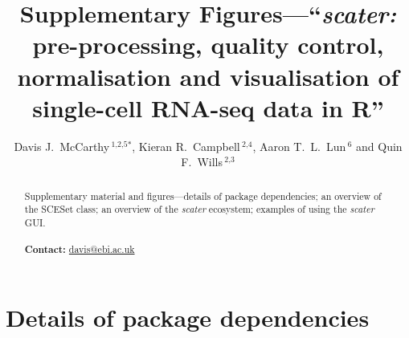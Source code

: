 \documentclass{revtex4}
\begin{document}
\title[scater supplementary figures]{Supplementary Figures---``\emph{scater:} pre-processing, quality control, normalisation and visualisation of single-cell RNA-seq data in R''}
\author{Davis J.~McCarthy\,$^{\text{1,2,5}*}$, Kieran R.~Campbell\,$^{\text{2,4}}$, Aaron T.~L.~Lun\,$^{\text{6}}$ and Quin F.~Wills\,$^{\text{2,3}}$}
\address{$^{\text{1}}$European Molecular Biology Laboratory - European Bioinformatics Institute (EMBL-EBI), Hinxton CB10 1SD, United Kingdom;\\
$^{\text{2}}$Wellcome Trust Centre for Human Genetics, University of Oxford,
Roosevelt Drive, Oxford OX3 7BN, United Kingdom;\\
$^{\text{3}}$Weatherall Institute for Molecular Medicine, University of Oxford, John Radcliffe Hospital, Oxford OX3 9DS, United Kingdom;\\
$^{\text{4}}$Department of Physiology, Anatomy and Genetics, University of Oxford, South Parks Road, Oxford OX1 3QX, United Kingdom;\\
$^{\text{5}}$St Vincent's Institute of Medical Research, 41 Victoria Parade, Fitzroy Victoria 3065, Australia; and \\
$^{\text{6}}$CRUK Cambridge Institute, University of Cambridge, Robinson Way, Cambridge CB2 0RE, United Kingdom.
}

\begin{abstract}
Supplementary material and figures---details of package dependencies; an overview of the SCESet class; an overview of the \emph{scater} ecosystem; examples of using the \emph{scater} GUI.\\ \\
\textbf{Contact:} \href{davis@ebi.ac.uk}{davis@ebi.ac.uk}
\end{abstract}


\maketitle


\section*{Details of package dependencies}
\end{document}
